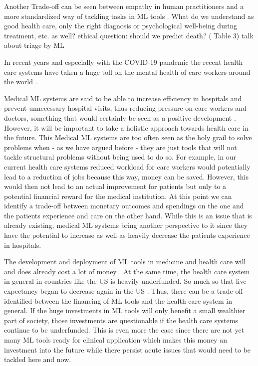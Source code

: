 Another Trade-off can be seen between empathy in human practitioners and a more standardized way of tackling tasks in ML tools \cite{Morley2020}. What do we understand as good health care, only the right diagnosis or psychological well-being during treatment,  etc.  as well? 
ethical question: should we predict death? (\cite{topol2019high} Table 3) \cite{he2019practical} talk about triage by ML


In recent years and especially with the COVID-19 pandemic the recent health care systems have taken a huge toll on the mental health of care workers around the world \cite{vizheh2020mental}. 

Medical ML systems are said to be able to increase efficiency in hospitals and prevent unnecessary hospital visits, thus reducing pressure on care workers and doctors, something that would certainly be seen as a positive development \cite{horgan2019artificial}. However, it will be important to take a holistic approach towards health care in the future. This Medical ML systems are too often seen as the holy grail to solve problems when - as we have argued before - they are just tools that will not tackle structural problems without being used to do so. For example, in our current health care systems reduced workload for care workers would potentially lead to a reduction of jobs because this way, money can be saved. However, this would then not lead to an actual improvement for patients but only to a potential financial reward for the medical institution. At this point we can identify a trade-off between monetary outcomes and spendings on the one and the patients experience and care on the other hand. While this is an issue that is already existing, medical ML systems bring another perspective to it since they have the potential to increase as well as heavily decrease the patients experience in hospitals.


The development and deployment of ML tools in medicine and health care will and does already cost a lot of money  \cite{he2019practical}. At the same time, the health care system in general in countries like the US is heavily underfunded. So much so that live expectancy began to decrease again in the US \cite{topol2019high}. Thus, there can be a trade-off identified between the financing of ML tools and the health care system in general. If the huge investments in ML tools will only benefit a small wealthier part of society, those investments are questionable if the health care systems continue to be underfunded. This is even more the case since there are not yet many ML tools ready for clinical application which makes this money an investment into the future while there persist acute issues that would need to be tackled here and now.


